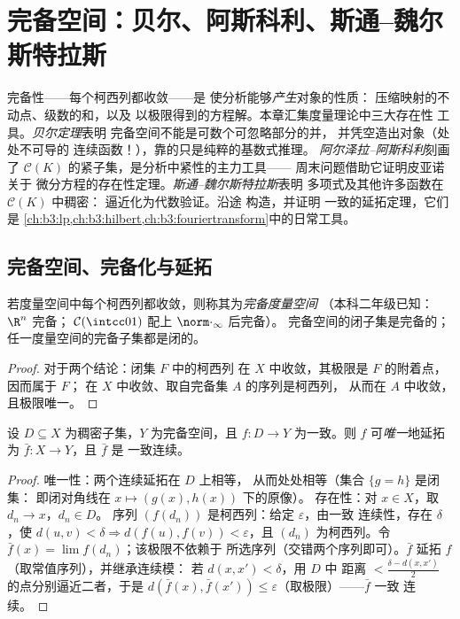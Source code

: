 \chapter{完备空间：贝尔、阿斯科利、斯通–魏尔斯特拉斯}
\label{ch:b3:complete}

完备性——每个柯西列都收敛——是
使分析能够\emph{产生}对象的性质：
压缩映射的不动点、级数的和，以及
以极限得到的方程解。本章汇集度量理论中三大存在性
工具。\emph{贝尔定理}表明
完备空间不能是可数个可忽略部分的并，
并凭空造出对象（处处不可导的
连续函数！），靠的只是纯粹的基数式推理。
\emph{阿尔泽拉–阿斯科利}刻画了
$\mathcal C(K)$ 的紧子集，是分析中紧性的主力工具——
周末问题借助它证明皮亚诺关于
微分方程的存在性定理。\emph{斯通–魏尔斯特拉斯}表明
多项式及其他许多函数在 $\mathcal C(K)$ 中稠密：
逼近化为代数验证。沿途
构造，并证明
一致的延拓定理，它们是
\cref{ch:b3:lp,ch:b3:hilbert,ch:b3:fouriertransform}中的日常工具。

\section{完备空间、完备化与延拓}

\begin{definition}\label{def:b3:complete:complete}
若度量空间中每个柯西列都收敛，则称其为\emph{完备度量空间}
（本科二年级已知：$\R^n$ 完备；
$\mathcal C(\intcc01)$ 配上 $\norm\cdot_\infty$ 后完备）。
完备空间的闭子集是完备的；
任一度量空间的完备子集都是闭的。
\end{definition}

\begin{proof}
对于两个结论：闭集 $F$ 中的柯西列
在 $X$ 中收敛，其极限是 $F$ 的附着点，因而属于 $F$；
在 $X$ 中收敛、取自完备集 $A$ 的序列是柯西列，
从而在 $A$ 中收敛，且极限唯一。
\end{proof}

\begin{theorem}[一致连续映射的延拓]
\label{thm:b3:complete:extension}
设 $D \subseteq X$ 为稠密子集，$Y$ 为完备空间，且 $f \colon D \to
Y$ 为一致。则 $f$ 可\emph{唯一}地延拓为
 $\bar f \colon X \to Y$，且 $\bar f$ 是
一致连续。
\end{theorem}

\begin{proof}
唯一性：两个连续延拓在 $D$ 上相等，
从而处处相等（集合 $\{g = h\}$ 是闭集：
即闭对角线在 $x\mapsto(g(x), h(x))$ 下的原像）。
存在性：对 $x \in X$，取 $d_n \to x$，$d_n \in D$。
序列 $(f(d_n))$ 是柯西列：给定 $\varepsilon$，由一致
连续性，存在 $\delta$，使 $d(u,v) < \delta \Rightarrow
d(f(u), f(v)) < \varepsilon$，且 $(d_n)$ 为柯西列。令
$\bar f(x) = \lim f(d_n)$；该极限不依赖于
所选序列（交错两个序列即可）。$\bar f$ 延拓 $f$
（取常值序列），并继承连续模：
若 $d(x, x') < \delta$，用 $D$ 中
距离 $< \frac{\delta - d(x,x')}2$ 的点分别逼近二者，于是 $d(\bar f(x), \bar
f(x')) \leq \varepsilon$（取极限）——$\bar f$ 一致
连续。
\end{proof}

